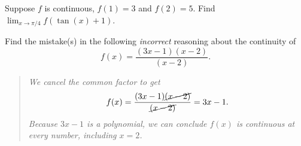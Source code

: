 \documentclass[../main.tex]{subfiles}
\begin{document}
  \begin{example}
    Suppose \(f\) is continuous, \(f(1) = 3\) and \(f(2) = 5\).  Find \(\lim_{x \to \pi/4} f( \tan(x) + 1 )\).

  \end{example}

  \begin{example}
    Find the mistake(s) in the following \emph{incorrect} reasoning about the continuity of \[f(x) = \frac{(3x-1)(x-2)}{(x-2)}.\]
    \bigskip

    \begin{quote}
      \itshape
      We cancel the common factor to get
      \[
        f(x) = \frac{(3x - 1)\cancel{(x - 2)}}{\cancel{(x-2)}} = 3x - 1.
      \]
      Because \(3x - 1\) is a polynomial, we can conclude \(f(x)\) is continuous at every number, including \(x=2\).
    \end{quote}

  \end{example}
\end{document}
